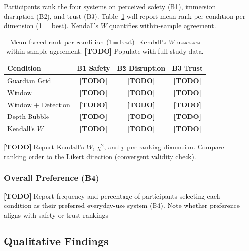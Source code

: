 \documentclass{styling/vgtc} %
\begin{document}
Participants rank the four systems on perceived safety (B1), immersion
disruption (B2), and trust (B3). Table~\ref{tab:rankings} will report
mean rank per condition per dimension (1 = best). Kendall's $W$
quantifies within-sample agreement.

\begin{table}[h]
\centering
\caption{Mean forced rank per condition (1\,=\,best). Kendall's $W$
  assesses within-sample agreement. \textbf{[TODO]} Populate with
  full-study data.}
\label{tab:rankings}
\renewcommand{\arraystretch}{1.2}
\small
\begin{tabular}{@{} l c c c @{}}
\toprule
\textbf{Condition} &
  \textbf{B1 Safety} &
  \textbf{B2 Disruption} &
  \textbf{B3 Trust} \\
\midrule
Guardian Grid      & \textbf{[TODO]} & \textbf{[TODO]} & \textbf{[TODO]} \\
Window             & \textbf{[TODO]} & \textbf{[TODO]} & \textbf{[TODO]} \\
Window + Detection & \textbf{[TODO]} & \textbf{[TODO]} & \textbf{[TODO]} \\
Depth Bubble       & \textbf{[TODO]} & \textbf{[TODO]} & \textbf{[TODO]} \\
\midrule
Kendall's $W$      & \textbf{[TODO]} & \textbf{[TODO]} & \textbf{[TODO]} \\
\bottomrule
\end{tabular}
\end{table}

\textbf{[TODO]} Report Kendall's $W$, $\chi^2$, and $p$ per ranking
dimension. Compare ranking order to the Likert direction (convergent
validity check).

\subsubsection{Overall Preference (B4)}

\textbf{[TODO]} Report frequency and percentage of participants
selecting each condition as their preferred everyday-use system (B4).
Note whether preference aligns with safety or trust rankings.


\subsection{Qualitative Findings}
\end{document}
